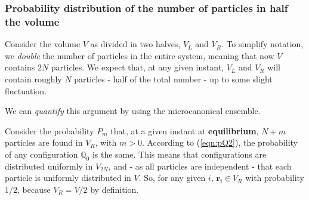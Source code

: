 \documentclass[../../main.tex]{subfiles}
\begin{document}
\subsubsection{Probability distribution of the number of particles in half the volume} %
Consider the volume $V$ as divided in two halves, $V_L$ and $V_R$. To simplify notation, we \textit{double} the number of particles in the entire system, meaning that now $V$ contains $2N$ particles. We expect that, at any given instant, $V_L$ and $V_R$ will contain roughly $N$ particles - half of the total number - up to some slight fluctuation. 

\medskip

We can \textit{quantify} this argument by using the microcanonical ensemble. 

Consider the probability $P_m$ that, at a given instant at \textbf{equilibrium}, $N+m$ particles are found in $V_R$, with $m > 0$. According to (\ref{eqn:pQ2}), the probability of any configuration $\mathbb{Q}_0$ is the same. This means that configurations are distributed uniformly in $V_{2N}$, and - as all particles are independent - that each particle is uniformly distributed in $V$. So, for any given $i$, $\bm{r_i} \in V_R$ with probability $1/2$, because $V_R = V/2$ by definition. 
\end{document}
